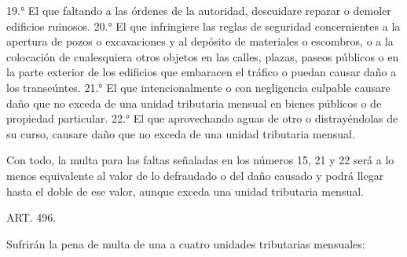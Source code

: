     19.° El que faltando a las órdenes de la autoridad, descuidare reparar o demoler edificios ruinosos.
    20.° El que infringiere las reglas de seguridad concernientes a la apertura de pozos o excavaciones y al depósito de materiales o escombros, o a la colocación de cualesquiera otros objetos en las calles, plazas, paseos públicos o en la parte exterior de los edificios que embaracen el tráfico o puedan causar daño a los transeúntes.
    21.° El que intencionalmente o con negligencia culpable causare daño que no exceda de una unidad tributaria mensual en bienes públicos o de propiedad particular.
    22.° El que aprovechando aguas de otro o distrayéndolas de su curso, causare daño que no exceda de una unidad tributaria mensual.

    Con todo, la multa para las faltas señaladas en los números 15, 21 y 22 será a lo menos equivalente al valor de lo defraudado o del daño causado y podrá llegar hasta el doble de ese valor, aunque exceda una unidad tributaria mensual.



    ART. 496.

    Sufrirán la pena de multa de una a cuatro unidades tributarias mensuales:

